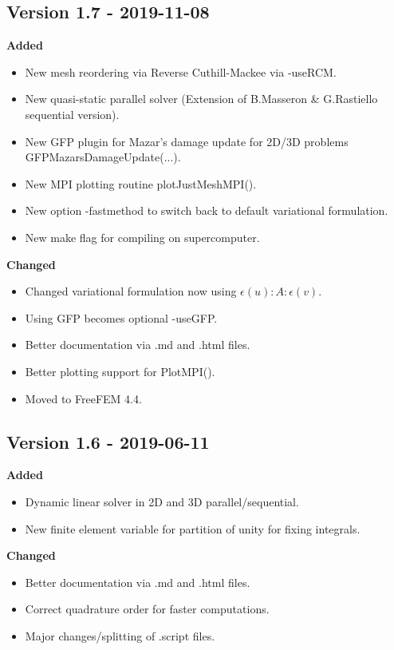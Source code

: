 \documentclass{report}
\begin{document}
\subsection{Version 1.7 - 2019-11-08}

\textbf{Added}
\begin{itemize}
 \item New  mesh reordering via Reverse Cuthill-Mackee via {\ttfamily -useRCM}. 
 \item New quasi-static parallel solver (Extension of B.Masseron \& G.Rastiello sequential version).
 \item New GFP plugin for Mazar's damage update for 2D/3D problems {\ttfamily GFPMazarsDamageUpdate(...)}.
 \item New MPI plotting routine {\ttfamily plotJustMeshMPI()}.
 \item New option {\ttfamily -fastmethod} to switch back to default variational formulation.
 \item New  make flag for compiling on supercomputer. 
\end{itemize}

\textbf{Changed}
\begin{itemize}
 \item Changed variational formulation now using $\epsilon(u):A:\epsilon(v)$.
 \item Using GFP becomes optional {\ttfamily -useGFP}.
 \item Better documentation via {\ttfamily .md} and {\ttfamily .html} files.
 \item Better plotting support for {\ttfamily PlotMPI()}.
 \item Moved to FreeFEM 4.4.
\end{itemize}


\subsection{Version 1.6 - 2019-06-11}

\textbf{Added}
\begin{itemize}
 \item Dynamic linear solver in 2D and 3D  parallel/sequential.
 \item New finite element variable for partition of unity for fixing integrals.
\end{itemize}


\textbf{Changed}
\begin{itemize}
 \item Better documentation via {\ttfamily.md} and {\ttfamily.html} files.
 \item Correct quadrature order for faster computations.
 \item Major changes/splitting of {\ttfamily.script} files.
\end{itemize}
\end{document}
